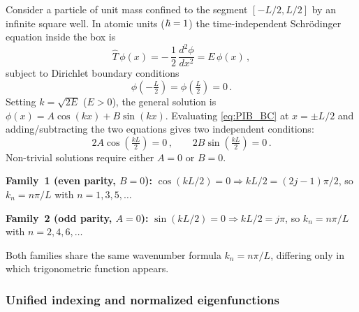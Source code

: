 Consider a particle of unit mass confined to the segment $[-L/2, L/2]$ by an
infinite square well.  In atomic units ($\hbar = 1$) the time-independent
Schrödinger equation inside the box is
\begin{equation}\label{eq:PIB_TISE}
  \hat{T}\,\phi(x) = -\,\frac{1}{2}\,\frac{d^2\phi}{dx^2} = E\,\phi(x)\,,
\end{equation}
subject to Dirichlet boundary conditions
\begin{equation}\label{eq:PIB_BC}
  \phi\!\left(-\tfrac{L}{2}\right) = \phi\!\left(\tfrac{L}{2}\right) = 0\,.
\end{equation}
Setting $k = \sqrt{2E}$ ($E > 0$), the general solution is
$\phi(x) = A\cos(kx) + B\sin(kx)$.
Evaluating \cref{eq:PIB_BC} at $x = \pm L/2$ and adding/subtracting the two equations
gives two independent conditions:
\begin{equation}
  2A\cos\!\left(\tfrac{kL}{2}\right) = 0\,,\qquad
  2B\sin\!\left(\tfrac{kL}{2}\right) = 0\,.
\end{equation}
Non-trivial solutions require either $A = 0$ or $B = 0$.

\textbf{Family~1 (even parity, $B = 0$):}
$\cos(kL/2) = 0 \Rightarrow kL/2 = (2j-1)\pi/2$, so $k_n = n\pi/L$ with $n = 1, 3, 5, \ldots$

\textbf{Family~2 (odd parity, $A = 0$):}
$\sin(kL/2) = 0 \Rightarrow kL/2 = j\pi$, so $k_n = n\pi/L$ with $n = 2, 4, 6, \ldots$

Both families share the same wavenumber formula $k_n = n\pi/L$, differing only in
which trigonometric function appears.

\subsubsection{Unified indexing and normalized eigenfunctions}

